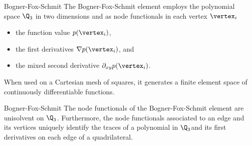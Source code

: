 \begin{Example}{Bogner-Fox-Schmit}
  The Bogner-Fox-Schmit element employs the polynomial space $\Q_3$ in
  two dimensions and as node functionals in each vertex $\vertex_i$
  \begin{itemize}
  \item the function value $p(\vertex_i)$,
  \item the first derivatives $\nabla p(\vertex_i)$, and
  \item the mixed second derivative $\partial_{xy}p(\vertex_i)$.
  \end{itemize}
  When used on a Cartesian mesh of squares, it generates a finite
  element space of continuously differentiable functions.
\end{Example}

\begin{Lemma}{Bogner-Fox-Schmit}
  The node functionals of the Bogner-Fox-Schmit element are unisolvent
  on $\Q_3$. Furthermore, the node functionals associated to an edge
  and its vertices uniquely identify the traces of a polynomial in
  $\Q_3$and its first derivatives on each edge of a quadrilateral.
\end{Lemma}

